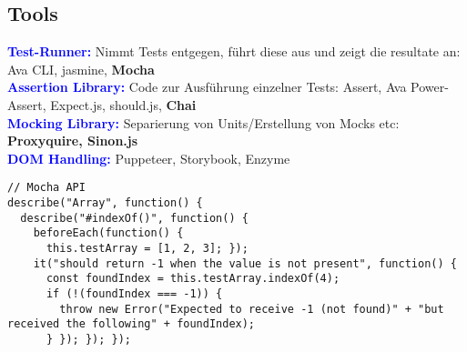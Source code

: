 \subsection{Tools}
\textbf{\textcolor{blue}{Test-Runner:}} Nimmt Tests entgegen, führt diese aus und zeigt die resultate an: Ava CLI, jasmine, \textbf{Mocha}\\
\textbf{\textcolor{blue}{Assertion Library:}} Code zur Ausführung einzelner Tests: Assert, Ava Power-Assert, Expect.js, should.js, \textbf{Chai}\\
\textbf{\textcolor{blue}{Mocking Library:}} Separierung von Units/Erstellung von Mocks etc: \textbf{Proxyquire, Sinon.js}\\
\textbf{\textcolor{blue}{DOM Handling:}} Puppeteer, Storybook, Enzyme
\begin{lstlisting}[style=htmlcssjs]
// Mocha API
describe("Array", function() {
  describe("#indexOf()", function() {
    beforeEach(function() {
      this.testArray = [1, 2, 3]; });
    it("should return -1 when the value is not present", function() {
      const foundIndex = this.testArray.indexOf(4);
      if (!(foundIndex === -1)) {
        throw new Error("Expected to receive -1 (not found)" + "but received the following" + foundIndex);
      } }); }); });
\end{lstlisting}